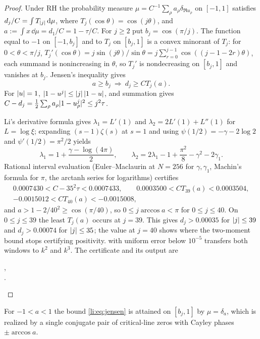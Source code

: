 \begin{proof}
Under RH the probability measure $\mu=C^{-1}\sum_\rho a_\rho\delta_{\Re u_\rho}$ on $[-1,1]$
satisfies $d_j/C=\int T_{\lvert j\rvert}\,\mathrm{d}\mu$, where $T_j(\cos\theta)=\cos(j\theta)$, and
$a:=\int x\,\dd\mu=d_1/C=1-\tau/C$. For $j\ge2$ put $b_j=\cos(\pi/j)$. The function equal to $-1$
on $[-1,b_j]$ and to $T_j$ on $[b_j,1]$ is a convex minorant of $T_j$: for $0<\theta<\pi/j$,
$T_j'(\cos\theta)=j\sin(j\theta)/\sin\theta=j\sum_{r=0}^{j-1}\cos((j-1-2r)\theta)$, each summand is
nonincreasing in $\theta$, so $T_j'$ is nondecreasing on $[b_j,1]$ and vanishes at $b_j$. Jensen's
inequality gives
\begin{equation}\label{li:eq:jensen}
 a\ge b_j\ \Longrightarrow\ d_j\ge CT_j(a).
\end{equation}
For $\lvert u\rvert=1$, $\lvert1-u^j\rvert\le\lvert j\rvert\,\lvert1-u\rvert$, and summation gives
$C-d_j=\frac12\sum_\rho a_\rho\lvert1-u_\rho^j\rvert^2\le j^2\tau$.

Li's derivative formula gives $\lambda_1=L'(1)$ and $\lambda_2=2L'(1)+L''(1)$ for
$L=\log\xi$; expanding $(s-1)\zeta(s)$ at $s=1$ and using $\psi(1/2)=-\gamma-2\log2$ and
$\psi'(1/2)=\pi^2/2$ yields
\[
 \lambda_1=1+\frac{\gamma-\log(4\pi)}2,\qquad
 \lambda_2=2\lambda_1-1+\frac{\pi^2}8-\gamma^2-2\gamma_1 .
\]
Rational interval evaluation (Euler--Maclaurin at $N=256$ for $\gamma,\gamma_1$, Machin's
formula for $\pi$, the arctanh series for logarithms) certifies
\begin{gather*}
 0.0007430<C-35^2\tau<0.0007433,\qquad 0.0003500<CT_{39}(a)<0.0003504,\\
 -0.0015012<CT_{40}(a)<-0.0015008,
\end{gather*}
and $a>1-2/40^2\ge\cos(\pi/40)$, so $0\le j\arccos a<\pi$ for $0\le j\le40$. On $0\le j\le39$ the
least $T_j(a)$ occurs at $j=39$. This gives $d_j>0.00035$ for $\lvert j\rvert\le39$ and $d_j>0.00074$ for
$\lvert j\rvert\le35$; the value at $j=40$ shows where the two-moment bound stops certifying positivity.
 with uniform error below $10^{-5}$ transfers both windows to $k^2$ and $k^3$.
The certificate and its output are
\begin{center}
,\\
.
\end{center}
\end{proof}

For $-1<a<1$ the bound \eqref{li:eq:jensen} is attained on $[b_j,1]$ by $\mu=\delta_a$, which is
realized by a single conjugate pair of critical-line zeros with Cayley phases $\pm\arccos a$.

